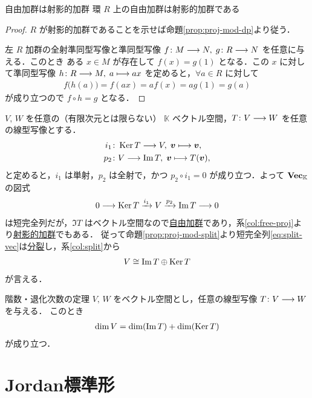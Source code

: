 \documentclass[rep_main]{subfiles}
\begin{document}
\begin{mycol}[label=col:free-proj]{自由加群は射影的加群}
    環 $R$ 上の自由加群は射影的加群である
\end{mycol}

\begin{proof}
    $R$ が射影的加群であることを示せば命題\ref{prop:proj-mod-dp}より従う．

    左 $R$ 加群の全射準同型写像と準同型写像 $f \colon M \longrightarrow N,\; g\colon R \longrightarrow N$ を任意に与える．このとき
    ある $x \in M$ が存在して $f(x) = g(1)$ となる．この $x$ に対して準同型写像 $h \colon R \longrightarrow M,\; a \longmapsto ax$ を定めると，$\forall a \in R$ に対して
    \begin{align}
        f \bigl( h(a) \bigr)  = f(ax) = af(x) = ag(1) = g(a)
    \end{align}
    が成り立つので $f \circ h = g$ となる．
\end{proof}

$V,\, W$ を任意の（有限次元とは限らない） $\mathbb{K}$ ベクトル空間，$T \colon V \longrightarrow W$ を任意の線型写像とする．
\begin{align}
	i_1 &\colon \operatorname{Ker} T  \longrightarrow V,\; \bm{v} \longmapsto \bm{v}, \\
	p_2 &\colon V \longrightarrow \Im T,\; \bm{v} \longmapsto T(\bm{v}),
\end{align}
と定めると，$i_1$ は単射，$p_2$ は全射で，かつ $p_2 \circ i_1 = 0$ が成り立つ．よって $\bm{\mathrm{Vec}_{\mathbb{K}}}$ の図式
\begin{align}
	\label{eq:split-vec}
	0 \longrightarrow \operatorname{Ker} T \xrightarrow{i_1} V \xrightarrow{p_2} \Im T \longrightarrow 0
\end{align}
は短完全列だが，$\Im T$ はベクトル空間なので\hyperref[def:free-mod]{自由加群}であり，系\ref{col:free-proj}より\hyperref[def:proj-mod]{射影的加群}でもある．
従って命題\ref{prop:proj-mod-split}より短完全列\eqref{eq:split-vec}は\hyperref[def:split]{分裂}し，系\ref{col:split}から
\begin{align}
	V \cong \Im T \oplus \operatorname{Ker} T
\end{align}
が言える．

\begin{mytheo}[label=thm:rank-nullity]{階数・退化次数の定理}
	$V,\, W$ をベクトル空間とし，任意の線型写像 $T \colon V \longrightarrow W$ を与える．
	このとき
	\begin{align}
		\dim V = \dim (\Im T) + \dim (\operatorname{Ker} T)
	\end{align}
	が成り立つ．
\end{mytheo}

\section{Jordan標準形}
\end{document}
